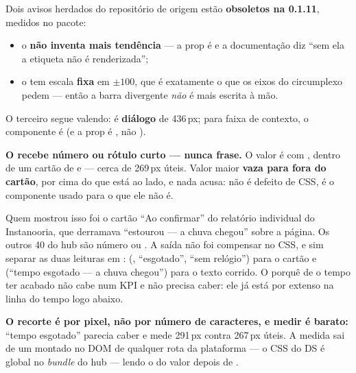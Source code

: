 \begin{nota}
Dois avisos herdados do repositório de origem estão \textbf{obsoletos na 0.1.11},
medidos no pacote:

\begin{itemize}
  \item o  \textbf{não inventa mais tendência} --- a prop é
     e a documentação diz \enquote{sem ela a etiqueta não é
    renderizada};
  \item o  tem escala \textbf{fixa} em $\pm 100$, que
    é exatamente o que os eixos do circumplexo pedem --- então a barra divergente
    \emph{não} é mais escrita à mão.
\end{itemize}

O terceiro segue valendo:  é \textbf{diálogo} de 436\,px; para faixa
de contexto, o componente é  (e a prop é , não
).
\end{nota}

\begin{atencao}
\textbf{O  recebe número ou rótulo curto --- nunca frase.} O
valor é  com ,
dentro de um cartão de  e  --- cerca de
269\,px úteis. Valor maior \textbf{vaza para fora do cartão}, por cima do que
está ao lado, e nada acusa: não é defeito de CSS, é o componente usado para o
que ele não é.

Quem mostrou isso foi o cartão \enquote{Ao confirmar} do relatório individual
do Instanooria, que derramava \enquote{estourou --- a chuva chegou} sobre a
página. Os outros 40  do hub são número ou . A saída
não foi compensar no CSS, e sim separar as duas leituras em
:  (,
\enquote{esgotado}, \enquote{sem relógio}) para o cartão e
 (\enquote{tempo esgotado --- a chuva chegou}) para o texto
corrido. O porquê de o tempo ter acabado não cabe num KPI e não precisa caber:
ele já está por extenso na linha do tempo logo abaixo.

\textbf{O recorte é por pixel, não por número de caracteres, e medir é barato:}
\enquote{tempo esgotado} parecia caber e mede 291\,px contra 267\,px úteis. A
medida sai de um  montado no DOM de qualquer rota da
plataforma --- o CSS do DS é global no \emph{bundle} do hub --- lendo o
 do valor depois de .
\end{atencao}

